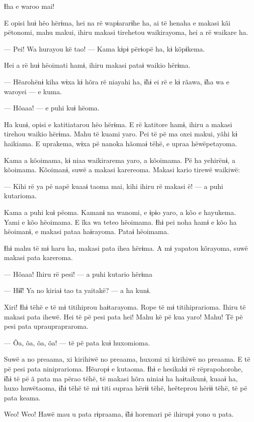 Ɨha e waroo mai! 

E opisi huɨ hëo hërɨma, hei na rë wapɨararɨhe ha, ai të henaha e makasi
kãi pëtonomi, mahu makui, ihiru makasi tirehetou waikirayoma, hei a rë
waikare ha. 

--- Pei! Wa hurayou kë tao! --- Kama kɨpɨ përɨopë ha, kɨ kõpɨkema. 

Hei a rë huɨ hëoimati hamɨ, ihiru makasi pataɨ waikio hërɨma. 

--- Hẽarohënɨ kiha wɨxa kɨ hõra rë niayahi ha, ɨ̃hɨ ei rë e kɨ rãawa, ɨ̃ha
wa e waroyei --- e kuma. 

--- Hõaaa! --- e puhi kuɨ hëoma. 

Ha kunɨ, opisi e katitiatarou hëo hërɨma. E rë katitore hamɨ, ihiru a
makasi tirehou waikio hërɨma. Mahu të kuami yaro. Pei të pë ma oxei
makui, yãhi kɨ haikiama. E uprakema, wɨxa pë nanoka hãomaɨ tëhë, e upraa
hëwëpetayoma. 

Kama a kõoimama, kɨ niaa waikirarema yaro, a kõoimama. Pë ha yehirënɨ, a
kõoimama. Kõoimanɨ, suwë a makasi karereoma. Makasi kario tirewë
waikiwë:

--- Kihi rë ya pë napë kuaaɨ taoma mai, kihi ihiru rë makasi ë! --- a
puhi kutarioma. 

Kama a puhi kuɨ pëoma. Kamanɨ na wanomi, e ɨpɨo yaro, a kõo e hayukema.
Yami e kõo hëoimama. E ĩka wa teteo hëoimama. Ɨhɨ pei noha hamɨ e kõo ha
hëoimanɨ, e makasi pataa haɨrayoma. Pataɨ hëoimama. 

Ɨhɨ mahu të mɨ haru ha, makasi pata ihea hërɨma. A mɨ yapatou kõrayoma,
suwë makasi pata kareroma. 

--- Hõaaa! Ihiru rë pesi! --- a puhi kutario hërɨma 

--- Hɨ̃ɨ! Ya no kiriaɨ tao ta yaitakë? --- a ha kunɨ. 

Xiri! Ɨhɨ tëhë e të mɨ titihiprou haɨtarayoma. Rope të mɨ
titihiprarioma. Ihiru të makasi pata ihewë. Hei të pë pesi pata hei!
Mahu kë pë kua yaro! Mahu! Të pë pesi pata uprauprapraroma. 

--- Õa, õa, õa, õa! --- të pë pata kuɨ huxomioma. 

Suwë a no preaama, xi kirihiwë no preaama, huxomi xi kirihiwë no
preaama. E të pë pesi pata niniprarioma. Hẽaropɨ e kutaoma. Ɨhɨ e
hesikakɨ rë rëprapohorohe, ɨ̃hɨ të pë ã pata ma përao tëhë, të makasi
hõra niniaɨ ha haɨtaikunɨ, kuaaɨ ha, huxo huwëtaoma, ɨ̃hɨ tëhë të mɨ titi
supraa hërɨɨ tëhë, heẽteprou hërɨɨ tëhë, të pë pata keama. 

Weo! Weo! Hawë mau u pata rɨpraama, ɨ̃hɨ horemari pë ihirupɨ yono u
pata. 

